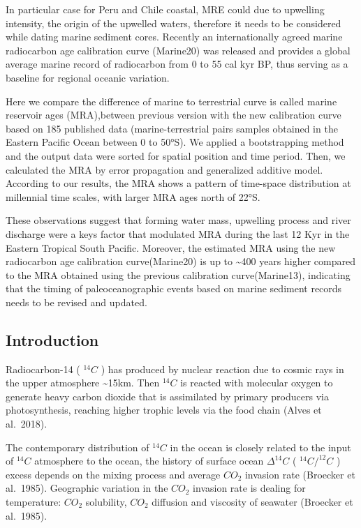 \documentclass[
]{article}
\begin{document}
In particular case for Peru and Chile coastal, MRE could due to
upwelling intensity, the origin of the upwelled waters, therefore it
needs to be considered while dating marine sediment cores. Recently an
internationally agreed marine radiocarbon age calibration curve
(Marine20) was released and provides a global average marine record of
radiocarbon from 0 to 55 cal kyr BP, thus serving as a baseline for
regional oceanic variation.

Here we compare the difference of marine to terrestrial curve is called
marine reservoir ages (MRA),between previous version with the new
calibration curve based on 185 published data (marine-terrestrial pairs
samples obtained in the Eastern Pacific Ocean between 0 to 50°S). We
applied a bootstrapping method and the output data were sorted for
spatial position and time period. Then, we calculated the MRA by error
propagation and generalized additive model. According to our results,
the MRA shows a pattern of time-space distribution at millennial time
scales, with larger MRA ages north of 22°S.

These observations suggest that forming water mass, upwelling process
and river discharge were a keys factor that modulated MRA during the
last 12 Kyr in the Eastern Tropical South Pacific. Moreover, the
estimated MRA using the new radiocarbon age calibration curve(Marine20)
is up to \textasciitilde400 years higher compared to the MRA obtained
using the previous calibration curve(Marine13), indicating that the
timing of paleoceanographic events based on marine sediment records
needs to be revised and updated.

\hypertarget{introduction}{%
\subsection{Introduction}\label{introduction}}

Radiocarbon-14 ( \(^{14}C\) ) has produced by nuclear reaction due to
cosmic rays in the upper atmosphere \textasciitilde15km. Then \(^{14}C\)
is reacted with molecular oxygen to generate heavy carbon dioxide that
is assimilated by primary producers via photosynthesis, reaching higher
trophic levels via the food chain (Alves et al.~2018).

The contemporary distribution of \(^{14}C\) in the ocean is closely
related to the input of \(^{14}C\) atmosphere to the ocean, the history
of surface ocean \(\Delta^{14}C\) ( \(^{14}C/^{12}C\) ) excess depends
on the mixing process and average \(CO_2\) invasion rate (Broecker et
al.~1985). Geographic variation in the \(CO_2\) invasion rate is dealing
for temperature: \(CO_2\) solubility, \(CO_2\) diffusion and viscosity
of seawater (Broecker et al.~1985).
\end{document}
